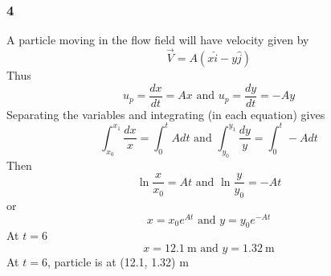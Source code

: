 \documentclass[class=report, crop=false, 12pt,a4paper]{standalone}
\begin{document}
\subsubsection{4}
A particle moving in the flow field will have velocity given by
\begin{equation}
  \vec{V} = A(x\hat{i} - y\hat{j})
\end{equation}
Thus
\begin{equation}
  u_p = \frac{dx}{dt} = Ax \textrm{ and } u_p = \frac{dy}{dt} = -Ay
\end{equation}
Separating the variables and integrating (in each equation) gives
\begin{equation}
  \int_{x_0}^{x_1} \frac{dx}{x} = \int_0^t A dt \textrm{ and } \int_{y_0}^{y_1} \frac{dy}{y} = \int_0^t -A dt
\end{equation}
Then
\begin{equation}
  \ln{\frac{x}{x_0}} = At \textrm{ and } \ln{\frac{y}{y_0}} = -At
\end{equation}
or 
\begin{equation}
  x = x_0 e^{At} \textrm{ and } y = y_0 e^{-At}
\end{equation}
At $t=6$
\begin{equation}
  x = 12.1 \ \si{\meter} \textrm{ and } y = 1.32 \ \si{\meter}
\end{equation}
At $t=6$, particle is at (12.1, 1.32) \si{\meter}
\end{document}
